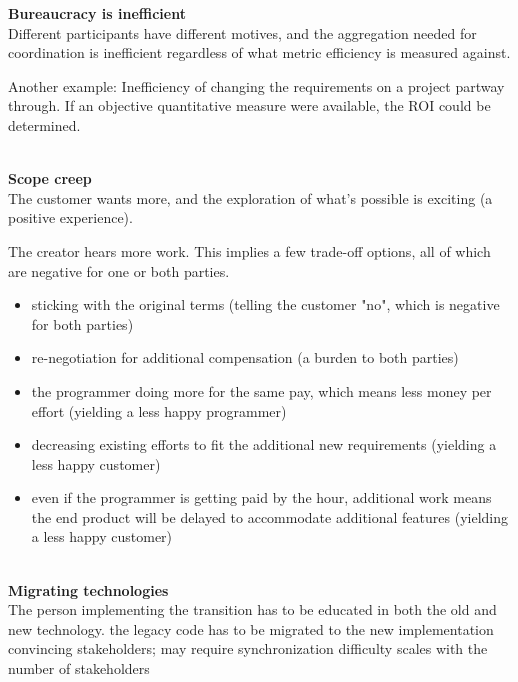 \textbf{Bureaucracy is inefficient}\\
Different participants have different motives, and the aggregation needed for coordination is inefficient regardless of what metric efficiency is measured against.

Another example: Inefficiency of changing the requirements on a project partway through. If an objective quantitative measure were available, the ROI could be determined. 

\ \\

\textbf{Scope creep} \\
The customer wants more, and the exploration of what's possible is exciting (a positive experience).

The creator hears more work. This implies a few trade-off options, all of which are negative for one or both parties.
\begin{itemize}
    \item sticking with the original terms (telling the customer "no", which is negative for both parties)
    \item re-negotiation for additional compensation (a burden to both parties)
    \item the programmer doing more for the same pay, which means less money per effort (yielding a less happy programmer)
    \item decreasing existing efforts to fit the additional new requirements (yielding a less happy customer)
    \item even if the programmer is getting paid by the hour, additional work means the end product will be delayed to accommodate additional features (yielding a less happy customer)
\end{itemize}

\ \\

\textbf{Migrating technologies} \\
The person implementing the transition has to be educated in both the old and new technology. 
the legacy code has to be migrated to the new implementation
convincing stakeholders; may require synchronization
difficulty scales with the number of stakeholders 
